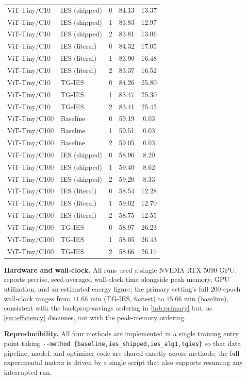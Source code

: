 \documentclass{article}
\newcommand{\win}[1]{\cellcolor{tgwin}#1}
\newcommand{\lose}[1]{\cellcolor{tglose}#1}
\theoremstyle{plain}
\theoremstyle{definition}
\theoremstyle{remark}
\begin{document}
\begin{longtable}{llccc}
ViT-Tiny/C10 & IES (shipped) & 0 & 84.13 & 13.37 \\
ViT-Tiny/C10 & IES (shipped) & 1 & 83.83 & 12.97 \\
ViT-Tiny/C10 & IES (shipped) & 2 & 83.81 & 13.06 \\
ViT-Tiny/C10 & IES (literal) & 0 & 84.32 & 17.05 \\
ViT-Tiny/C10 & IES (literal) & 1 & 83.90 & 16.48 \\
ViT-Tiny/C10 & IES (literal) & 2 & 83.37 & 16.52 \\
ViT-Tiny/C10 & TG-IES & 0 & \lose{84.26} & \win{25.80} \\
ViT-Tiny/C10 & TG-IES & 1 & \lose{83.47} & \win{25.30} \\
ViT-Tiny/C10 & TG-IES & 2 & \lose{83.41} & \win{25.45} \\
ViT-Tiny/C100 & Baseline & 0 & 59.19 & 0.03 \\
ViT-Tiny/C100 & Baseline & 1 & 59.51 & 0.03 \\
ViT-Tiny/C100 & Baseline & 2 & 59.05 & 0.03 \\
ViT-Tiny/C100 & IES (shipped) & 0 & 58.96 & 8.20 \\
ViT-Tiny/C100 & IES (shipped) & 1 & 59.40 & 8.62 \\
ViT-Tiny/C100 & IES (shipped) & 2 & 59.20 & 8.33 \\
ViT-Tiny/C100 & IES (literal) & 0 & 58.54 & 12.28 \\
ViT-Tiny/C100 & IES (literal) & 1 & 59.02 & 12.70 \\
ViT-Tiny/C100 & IES (literal) & 2 & 58.75 & 12.55 \\
ViT-Tiny/C100 & TG-IES & 0 & \lose{58.97} & \win{26.23} \\
ViT-Tiny/C100 & TG-IES & 1 & \lose{58.05} & \win{26.43} \\
ViT-Tiny/C100 & TG-IES & 2 & \lose{58.66} & \win{26.17} \\
\end{longtable}
\endgroup
\twocolumn

\textbf{Hardware and wall-clock.} All runs used a single NVIDIA RTX 5090 GPU.  reports precise, seed-averaged wall-clock time alongside peak memory, GPU utilization, and an estimated energy figure; the primary setting's full 200-epoch wall-clock ranges from $11.66$ min (TG-IES, fastest) to $15.66$ min (baseline), consistent with the backprop-savings ordering in \cref{tab:primary} but, as \cref{sec:efficiency} discusses, not with the peak-memory ordering.

\textbf{Reproducibility.} All four methods are implemented in a single training entry point taking \texttt{-{}-method \{baseline,ies\_shipped,ies\_alg1,tgies\}} so that data pipeline, model, and optimizer code are shared exactly across methods; the full experimental matrix is driven by a single script that also supports resuming any interrupted run.
\end{document}

